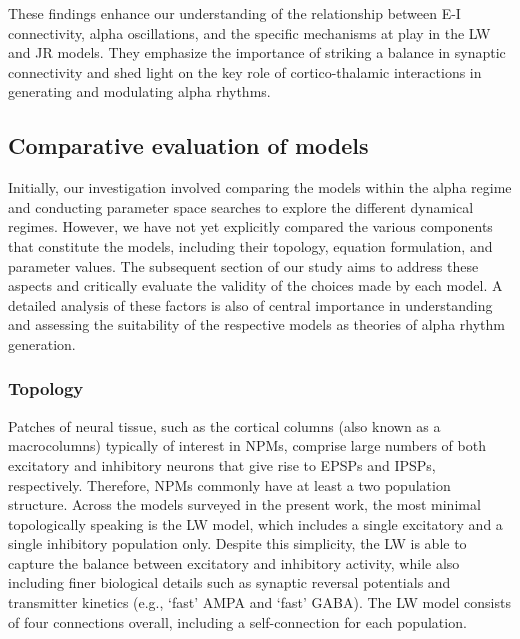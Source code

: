 \documentclass[12pt,twoside]{article}
\begin{document}
These findings enhance our understanding of the relationship between E-I connectivity, alpha oscillations, and the specific mechanisms at play in the LW and JR models. They emphasize the importance of striking a balance in synaptic connectivity and shed light on the key role of cortico-thalamic interactions in generating and modulating alpha rhythms.
\subsection{Comparative evaluation of models}

Initially, our investigation involved comparing the models within the alpha regime and conducting parameter space searches to explore the different dynamical regimes. However, we have not yet explicitly compared the various components that constitute the models, including their topology, equation formulation, and parameter values. The subsequent section of our study aims to address these aspects and critically evaluate the validity of the choices made by each model. A detailed analysis of these factors is also of central importance in understanding and assessing the suitability of the respective models as theories of alpha rhythm generation.

\subsubsection{Topology}
Patches of neural tissue, such as the cortical columns (also known as a macrocolumns) typically of interest in NPMs, comprise large numbers of both excitatory and inhibitory neurons that give rise to EPSPs and IPSPs, respectively. Therefore, NPMs commonly have at least a two population structure. Across the models surveyed in the present work, the most minimal topologically speaking is the LW model, which includes a single excitatory and a single inhibitory population only. Despite this simplicity, the LW is able to capture the balance between excitatory and inhibitory activity, while also including finer biological details such as synaptic reversal potentials and transmitter kinetics (e.g., `fast' AMPA and `fast' GABA). The LW model consists of four connections overall, including a self-connection for each population.%
\end{document}
